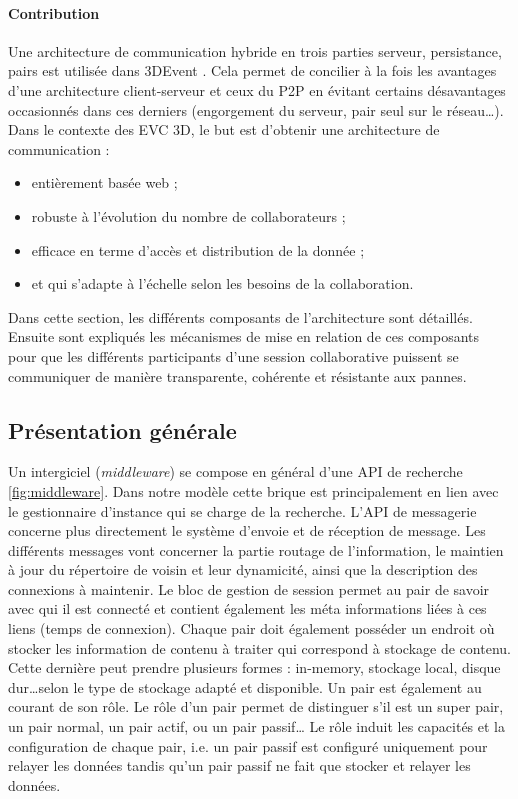 

\paragraph{Contribution}
Une architecture de communication hybride en trois parties serveur, persistance, 
pairs est utilisée dans 3DEvent \cite{Desprat2016}. Cela permet de concilier à la 
fois les avantages d'une architecture client-serveur et ceux du \gls{P2P} en évitant 
certains désavantages occasionnés dans ces derniers (engorgement du serveur, pair 
seul sur le réseau\dots). Dans le contexte des \gls{EVC} \gls{3D}, le but 
est d'obtenir une architecture de communication : 

\begin{itemize}
	\item entièrement basée web ; 
	\item robuste à l'évolution du nombre de collaborateurs ; 
	\item efficace en terme d'accès et distribution de la donnée ; 
	\item et qui s'adapte à l'échelle selon les besoins de la collaboration.
\end{itemize}

Dans cette section, les différents composants de l'architecture sont détaillés. 
Ensuite sont expliqués les mécanismes de mise en relation de 
ces composants pour que les différents participants d'une session 
collaborative puissent se communiquer de manière transparente, cohérente et 
résistante aux pannes.


\subsection{Présentation générale}
Un intergiciel (\textit{middleware}) se compose en général d'une \gls{API} de 
recherche \ref{fig:middleware}.
Dans notre modèle cette brique est principalement en lien avec le 
gestionnaire d'instance qui se charge de la recherche. L'\gls{API} de messagerie 
concerne plus directement le système d'envoie et de réception de message. Les 
différents messages vont concerner la partie routage de l'information, le 
maintien à jour du répertoire de voisin et leur dynamicité, ainsi que la 
description des connexions à maintenir. Le bloc de gestion de session permet au 
pair de savoir avec qui il est connecté et contient également les méta informations 
liées à ces liens (temps de connexion). 
Chaque pair doit également posséder un endroit où stocker les information de 
contenu à traiter qui correspond à stockage de contenu. Cette dernière peut 
prendre plusieurs formes : in-memory, stockage local, disque dur\dots selon le 
type de stockage adapté et disponible.
Un pair est également au courant de son rôle. Le rôle d'un pair permet de 
distinguer s'il est un super pair, un pair normal, un pair actif, ou un pair passif\dots 
Le rôle induit les capacités et la configuration de chaque pair, i.e. un pair passif 
est configuré uniquement pour relayer les données tandis qu'un pair passif ne fait que 
stocker et relayer les données.

